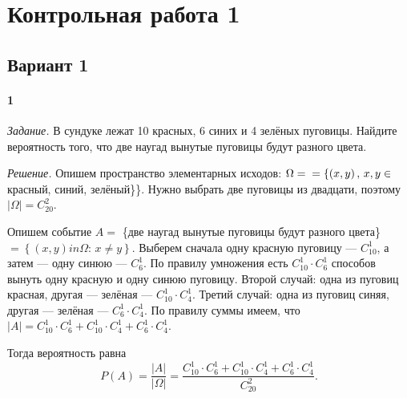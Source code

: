 \chapter*{Контрольная работа 1}

\section*{Вариант 1}

\subsubsection*{1}

\textit{Задание.} В сундуке лежат 10 красных, 6 синих и 4 зелёных пуговицы.
Найдите вероятность того, что две наугад вынутые пуговицы будут разного цвета.

\textit{Решение.}
Опишем пространство элементарных исходов: $ \Omega = \\ = \left\{ \left( x, y \right), \, x, y \in \right.$ красный, синий, зелёный\}\}.
Нужно выбрать две пуговицы из двадцати, поэтому $ \left| \Omega \right| = C_{20}^2$.

Опишем событие $A =$ \{две наугад вынутые пуговицы будут разного цвета\} $= \left\{ \left( x, y \right) in \Omega: \, x \neq y \right\} $.
Выберем сначала одну красную пуговицу --- $C_{10}^1$, а затем --- одну синюю --- $C_6^1$.
По правилу умножения есть $C_{10}^1 \cdot C_6^1$ способов вынуть одну красную и одну синюю пуговицу.
Второй случай: одна из пуговиц красная, другая --- зелёная --- $C_{10}^1 \cdot C_4^1$.
Третий случай: одна из пуговиц синяя, другая --- зелёная --- $C_6^1 \cdot C_4^1$.
По правилу суммы имеем, что $ \left| A \right| = C_{10}^1 \cdot C_6^1 + C_{10}^1 \cdot C_4^1 + C_6^1 \cdot C_4^1$.

Тогда вероятность равна
$$P \left( A \right) =
\frac{ \left| A \right| }{ \left| \Omega \right| } =
\frac{C_{10}^1 \cdot C_6^1 + C_{10}^1 \cdot C_4^1 + C_6^1 \cdot C_4^1}{C_{20}^2}.$$
